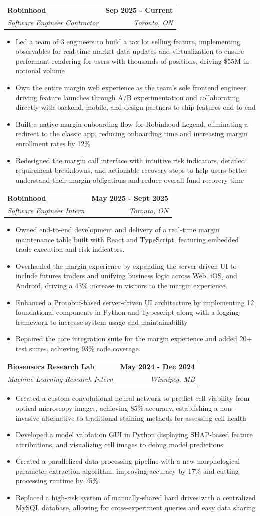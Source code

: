 \documentclass[11pt]{article}
\makeatletter
\newcommand{\resumeItem}[1]{
  \item\small{
    {\fontfamily{lmss}#1 \vspace{-2pt}}
  }
}
\newcommand{\resumeSubheadingUpd}[4]{
  \vspace{2pt}\item
    \begin{tabular*}{0.95\textwidth}[t]{l@{\extracolsep{\fill}}r}
      \hspace{1.2em}\textbf{#1} & {\bfseries #2} \\
      \hspace{1.25em}\textit{\small#3} & \textit{\small#4}
    \end{tabular*}\vspace{-7pt}
}
\newcommand{\resumeItemListStart}{\begin{itemize}}
\newcommand{\resumeItemListEnd}{\end{itemize}\vspace{-5pt}}
\makeatother
\begin{document}
\resumeSubheadingUpd{Robinhood}{Sep 2025 - Current}{Software Engineer Contractor}{Toronto, ON}
\vspace{0.3em}
\resumeItemListStart
\resumeItem{Led a team of 3 engineers to build a tax lot selling feature, implementing observables for real-time market data updates and virtualization to ensure performant rendering for users with thousands of positions, driving \$55M in notional volume}
\resumeItem{Own the entire margin web experience as the team's sole frontend engineer, driving feature launches through A/B experimentation and collaborating directly with backend, mobile, and design partners to ship features end-to-end}
\resumeItem{Built a native margin onboarding flow for Robinhood Legend, eliminating a redirect to the classic app, reducing onboarding time and increasing margin enrollment rates by 12\%}
\resumeItem{Redesigned the margin call interface with intuitive risk indicators, detailed requirement breakdowns, and actionable recovery steps to help users better understand their margin obligations and reduce overall fund recovery time}
\resumeItemListEnd


\resumeSubheadingUpd{Robinhood}{May 2025 - Sept 2025}{Software Engineer Intern}{Toronto, ON}
\vspace{0.3em}
\resumeItemListStart
\resumeItem{Owned end-to-end development and delivery of a real-time margin maintenance table built with React and TypeScript, featuring embedded trade execution and risk indicators.}
\resumeItem{Overhauled the margin experience by expanding the server-driven UI to include futures traders and unifying business logic across Web, iOS, and Android, driving a 43\% increase in visitors to the margin experience.}
\resumeItem{Enhanced a Protobuf-based server-driven UI architecture by implementing 12 foundational components in Python and Typescript along with a logging framework to increase system usage and maintainability}
\resumeItem{Repaired the core integration suite for the margin experience and added 20+ test suites, achieving 93\% code coverage}
\resumeItemListEnd

\resumeSubheadingUpd{Biosensors Research Lab}{May 2024 - Dec 2024}{Machine Learning Research Intern}{Winnipeg, MB}
\vspace{0.3em}
\resumeItemListStart
\resumeItem{Created a custom convolutional neural network to predict cell viability from optical microscopy images, achieving 85\% accuracy, establishing a non-invasive alternative to traditional staining methods for assessing cell health}
\resumeItem{Developed a model validation GUI in Python displaying SHAP-based feature attributions, and visualizing cell images to debug model predictions}
\resumeItem{Created a parallelized data processing pipeline with a new morphological parameter extraction algorithm, improving accuracy by 17\% and cutting processing runtime by 75\%.}
\resumeItem{Replaced a high-risk system of manually-shared hard drives with a centralized MySQL database, allowing for cross-experiment queries and easy data sharing}
\resumeItemListEnd
\end{document}
